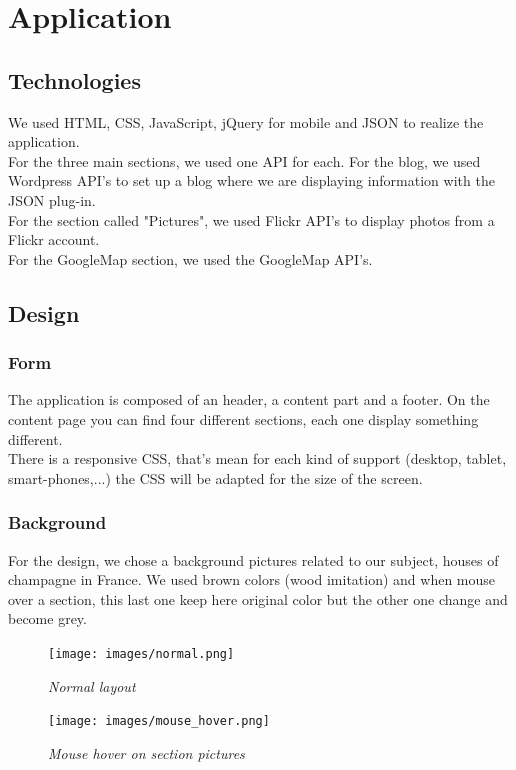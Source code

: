 \documentclass[12pt]{report}%
\begin{document}
\tableofcontents
\clearpage


\chapter{Application}
\section{Technologies}
We used HTML, CSS, JavaScript, jQuery for mobile and JSON to realize the application.\\
For the three main sections, we used one API for each. For the blog, we used Wordpress API's to set up a blog where we are displaying information with the JSON plug-in.\\
For the section called "Pictures", we used Flickr API's to display photos from a Flickr account.\\
For the GoogleMap section, we used the GoogleMap API's.
\section{Design}
\subsection{Form}
The application is composed of an header, a content part and a footer. On the content page you can find four different sections, each one display something different.\\
There is a responsive CSS, that's mean for each kind of support (desktop, tablet, smart-phones,...) the CSS will be adapted for the size of the screen.
\subsection{Background}
For the design, we chose a background pictures related to our subject, houses of champagne in France. We used brown colors (wood imitation) and when mouse over a section, this last one keep here original color but the other one change and become grey.
\begin{figure}[h]
    \begin{minipage}[c]{.45\linewidth}
        \centering
        \texttt{[image: images/normal.png]}
        \caption{\it Normal layout}
    \end{minipage}
    \hfill%
    \begin{minipage}[c]{.45\linewidth}
        \centering
        \texttt{[image: images/mouse\_hover.png]}
        \caption{\it Mouse hover on section pictures}
    \end{minipage}
\end{figure} 
\end{document}
